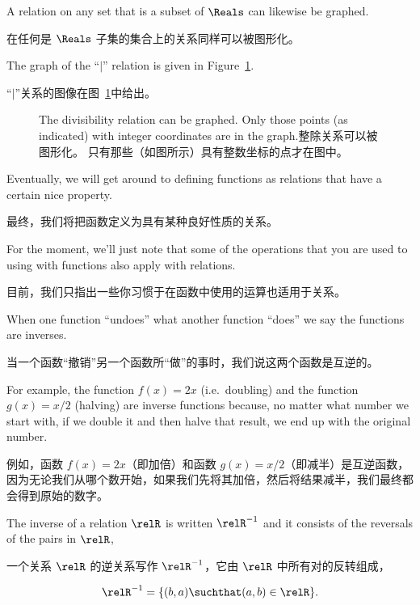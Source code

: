 A relation on any set that is a subset of $\Reals$ can likewise be
graphed.

在任何是 $\Reals$ 子集的集合上的关系同样可以被图形化。

The graph of the ``$\mid$'' relation is
given in Figure~\ref{fig:div_graph}.

“$\mid$”关系的图像在图~\ref{fig:div_graph}中给出。

\begin{figure}[!hbtp]
\begin{center}

\end{center}
\caption[The graph of the divisibility relation.整除关系的图像。]{The divisibility relation %
can be graphed.
Only those points (as indicated) with integer coordinates %
are in the graph.整除关系可以被图形化。
只有那些（如图所示）具有整数坐标的点才在图中。}
\label{fig:div_graph} 
\end{figure}
 
Eventually, we will get around to defining functions as relations that
have a certain nice property.

最终，我们将把函数定义为具有某种良好性质的关系。

For the moment, we'll just note that
some of the operations that you are used to using with functions
also apply with relations.

目前，我们只指出一些你习惯于在函数中使用的运算也适用于关系。

When one function ``undoes'' what another
function ``does'' we say the functions are inverses.

当一个函数“撤销”另一个函数所“做”的事时，我们说这两个函数是互逆的。

For example,
the function $f(x)=2x$ (i.e.\ doubling) and the function $g(x)=x/2$ (halving)
are inverse functions because, no matter what number we start with, if we
double it and then halve that result, we end up with the original number.

例如，函数 $f(x)=2x$（即加倍）和函数 $g(x)=x/2$（即减半）是互逆函数，因为无论我们从哪个数开始，如果我们先将其加倍，然后将结果减半，我们最终都会得到原始的数字。

The inverse of a relation $\relR$ is written $\relR^{-1}$ and it consists of
the reversals of the pairs in $\relR$,

一个关系 $\relR$ 的逆关系写作 $\relR^{-1}$，它由 $\relR$ 中所有对的反转组成，

\[ \relR^{-1} = \{ (b,a) \suchthat (a,b) \in \relR \}.
\]


